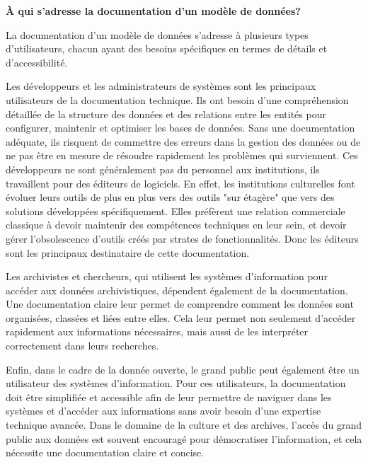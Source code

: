 \textbf{À qui s’adresse la documentation d’un modèle de données?}\newline

La documentation d'un modèle de données s'adresse à plusieurs types d’utilisateurs, chacun ayant des besoins spécifiques en termes de détails et d'accessibilité.\newline

Les développeurs et les administrateurs de systèmes sont les principaux utilisateurs de la documentation technique. Ils ont besoin d'une compréhension détaillée de la structure des données et des relations entre les entités pour configurer, maintenir et optimiser les bases de données. Sans une documentation adéquate, ils risquent de commettre des erreurs dans la gestion des données ou de ne pas être en mesure de résoudre rapidement les problèmes qui surviennent. Ces développeurs ne sont généralement pas du personnel aux institutions, ils travaillent pour des éditeurs de logiciels. En effet, les institutions culturelles font évoluer leurs outils de plus en plus vers des outils "sur étagère" que vers des solutions développées spécifiquement. Elles préfèrent une relation commerciale classique à devoir maintenir des compétences techniques en leur sein, et devoir gérer l'obsolescence d'outils créés par strates de fonctionnalités. Donc les éditeurs sont les principaux destinataire de cette documentation.\newline

Les archivistes et chercheurs, qui utilisent les systèmes d’information pour accéder aux données archivistiques, dépendent également de la documentation. Une documentation claire leur permet de comprendre comment les données sont organisées, classées et liées entre elles. Cela leur permet non seulement d’accéder rapidement aux informations nécessaires, mais aussi de les interpréter correctement dans leurs recherches. \newline

Enfin, dans le cadre de la donnée ouverte, le grand public peut également être un utilisateur des systèmes d’information. Pour ces utilisateurs, la documentation doit être simplifiée et accessible afin de leur permettre de naviguer dans les systèmes et d'accéder aux informations sans avoir besoin d'une expertise technique avancée. Dans le domaine de la culture et des archives, l’accès du grand public aux données est souvent encouragé pour démocratiser l'information, et cela nécessite une documentation claire et concise.\newline

